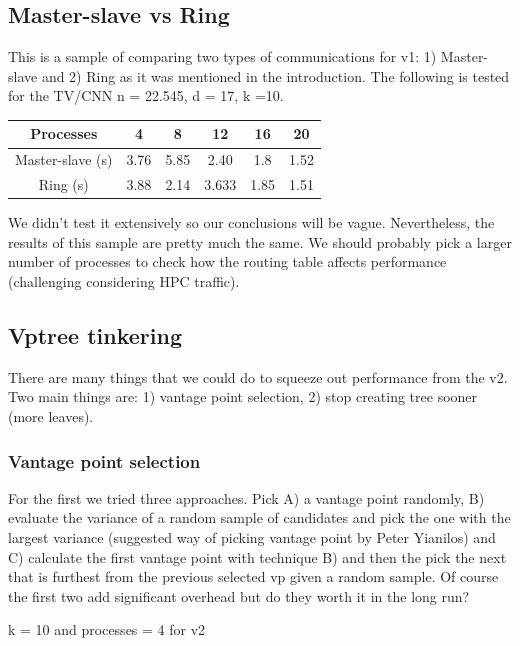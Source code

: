 \documentclass[12pt, a4paper]{article}
\begin{document}
\subsection{Master-slave vs Ring}

This is a sample of comparing two types of communications for v1: 1) Master-slave and 2) Ring as it was mentioned in the introduction. The following is tested for the TV/CNN n = 22.545, d = 17, k =10.
\begin{table}[h!]
\centering
\begin{tabular}{|c|c|c|c|c|c|}
	\hline
    Processes & 4 & 8 & 12 & 16 & 20  \\
	\hline
    Master-slave (s) & 3.76 & 5.85 & 2.40 & 1.8 & 1.52 \\
	\hline
    Ring (s) &  3.88 & 2.14 & 3.633 & 1.85 & 1.51 \\
	\hline
\end{tabular}
\end{table}

We didn't test it extensively so our conclusions will be vague. Nevertheless, the results of this sample are pretty much the same. We should probably pick a larger number of processes to check how the routing table affects performance (challenging considering HPC traffic).

\subsection{Vptree tinkering}

There are many things that we could do to squeeze out performance from the v2. Two main things are: 1) vantage point selection, 2) stop creating tree sooner (more leaves). 


\subsubsection{Vantage point selection}

For the first we tried three approaches. Pick A) a vantage point randomly, B) evaluate the variance of a random sample of candidates and pick the one with the largest variance (suggested way of picking vantage point by Peter Yianilos) and C) calculate the first vantage point with technique B) and then the pick the next that is furthest from the previous selected vp given a random sample. Of course the first two add significant overhead but do they worth it in the long run?

k = 10 and processes = 4 for v2
\end{document}
